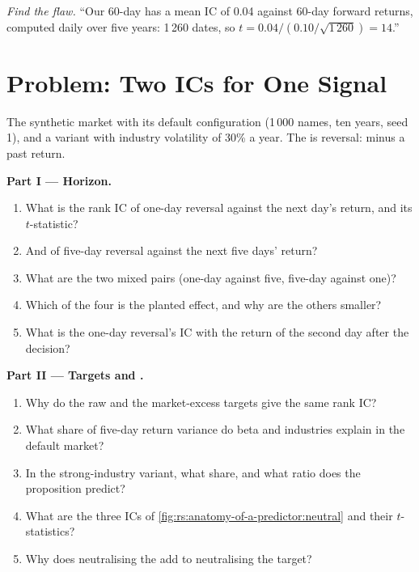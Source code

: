 \begin{exercise}[$\star\star\star$]\label{exo:rs:anatomy-of-a-predictor:8}
\emph{Find the flaw.} ``Our 60-day  has a mean IC of 0.04 against 60-day forward returns, computed daily over five years:
1\,260 dates, so $t = 0.04/(0.10/\sqrt{1\,260}) = 14$.''
\end{exercise}

\section{Problem: Two ICs for One Signal}

\begin{problem}\label{pb:rs:anatomy-of-a-predictor:1}
The synthetic market with its default configuration (1\,000 names, ten years, seed 1), and a variant with industry volatility of
30\% a year. The  is reversal: minus a past return.

\medskip\noindent\textbf{Part I --- Horizon.}
\begin{enumerate}
\item What is the rank IC of one-day reversal against the next day's return, and its $t$-statistic?
\item And of five-day reversal against the next five days' return?
\item What are the two mixed pairs (one-day against five, five-day against one)?
\item Which of the four is the planted effect, and why are the others smaller?
\item What is the one-day reversal's IC with the return of the second day after the decision?
\end{enumerate}

\medskip\noindent\textbf{Part II --- Targets and .}
\begin{enumerate}[resume]
\item Why do the raw and the market-excess targets give the same rank IC?
\item What share of five-day return variance do beta and industries explain in the default market?
\item In the strong-industry variant, what share, and what ratio does the proposition predict?
\item What are the three ICs of \cref{fig:rs:anatomy-of-a-predictor:neutral} and their $t$-statistics?
\item Why does neutralising the  add to neutralising the target?
\end{enumerate}


\end{problem}
